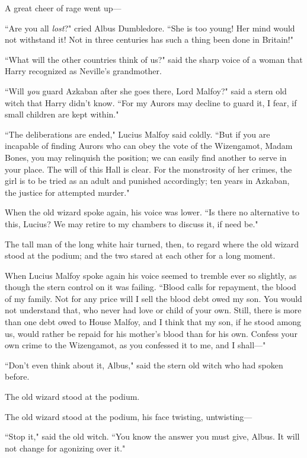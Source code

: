 A great cheer of rage went up—

``Are you all \emph{lost}?" cried Albus Dumbledore. ``She is too young! Her mind would not withstand it! Not in three centuries has such a thing been done in Britain!"

``What will the other countries think of us?" said the sharp voice of a woman that Harry recognized as Neville's grandmother.

``Will \emph{you} guard Azkaban after she goes there, Lord Malfoy?" said a stern old witch that Harry didn't know. ``For my Aurors may decline to guard it, I fear, if small children are kept within."

``The deliberations are ended," Lucius Malfoy said coldly. ``But if you are incapable of finding Aurors who can obey the vote of the Wizengamot, Madam Bones, you may relinquish the position; we can easily find another to serve in your place. The will of this Hall is clear. For the monstrosity of her crimes, the girl is to be tried as an adult and punished accordingly; ten years in Azkaban, the justice for attempted murder."

When the old wizard spoke again, his voice was lower. ``Is there no alternative to this, Lucius? We may retire to my chambers to discuss it, if need be."

The tall man of the long white hair turned, then, to regard where the old wizard stood at the podium; and the two stared at each other for a long moment.

When Lucius Malfoy spoke again his voice seemed to tremble ever so slightly, as though the stern control on it was failing. ``Blood calls for repayment, the blood of my family. Not for any price will I sell the blood debt owed my son. You would not understand that, who never had love or child of your own. Still, there is more than one debt owed to House Malfoy, and I think that my son, if he stood among us, would rather be repaid for his mother's blood than for his own. Confess your own crime to the Wizengamot, as you confessed it to me, and I shall—"

``Don't even think about it, Albus," said the stern old witch who had spoken before.

The old wizard stood at the podium.

The old wizard stood at the podium, his face twisting, untwisting—

``Stop it," said the old witch. ``You know the answer you must give, Albus. It will not change for agonizing over it."

